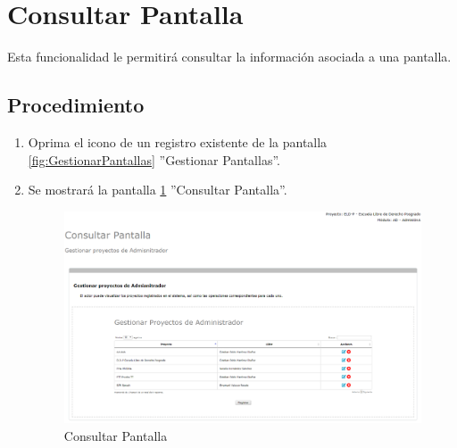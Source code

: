 \hypertarget{cv:consultarPantalla}{\section{Consultar Pantalla}} \label{sec:consultarPantalla}

	Esta funcionalidad le permitirá consultar la información asociada a una pantalla.

		\subsection{Procedimiento}

			\begin{enumerate}
	
			\item Oprima el icono \IUConsultar{} de un registro existente de la pantalla \ref{fig:GestionarPantallas} ''Gestionar Pantallas''.
	
			\item Se mostrará la pantalla \ref{fig:consultarPantallaA} ''Consultar Pantalla''.
			
			\begin{figure}[htbp!]
				\begin{center}
					\includegraphics[scale=0.5]{roles/lider/pantallas/pantallas/IU11-4consultarPantallaA}
					\caption{Consultar Pantalla}
					\label{fig:consultarPantallaA}
				\end{center}
			\end{figure}
		

\end{enumerate}
